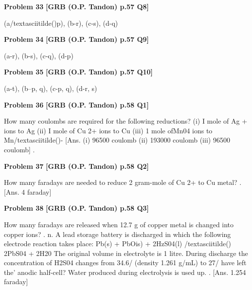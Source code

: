 \begin{problembox}
\textbf{Problem 33} \hfill \textbf{[GRB (O.P. Tandon) p.57 Q8]}
\label{q:ext-grb_all_questions-33}

(a/textasciitilde()p), (b-r), (c-s), (d-q)
\end{problembox}

\begin{problembox}
\textbf{Problem 34} \hfill \textbf{[GRB (O.P. Tandon) p.57 Q9]}
\label{q:ext-grb_all_questions-34}

(a-r), (b-s), (c-q), (d-p)
\end{problembox}

\begin{problembox}
\textbf{Problem 35} \hfill \textbf{[GRB (O.P. Tandon) p.57 Q10]}
\label{q:ext-grb_all_questions-35}

(a-t), (b--p, q), (c-p, q), (d-r, s)
\end{problembox}

\begin{problembox}
\textbf{Problem 36} \hfill \textbf{[GRB (O.P. Tandon) p.58 Q1]}
\label{q:ext-grb_all_questions-36}

How many coulombs are required for the following 
reductions? 
(i) I mole of Ag + ions to Ag 
(ii) I mole of Cu 2+ ions to Cu 
(iii) 1 mole ofMn04 ions to Mn/textasciitilde()-
[Ans. 
(i) 96500 coulomb (ii) 193000 coulomb (iii) 96500 
coulomb] 
.
\end{problembox}

\begin{problembox}
\textbf{Problem 37} \hfill \textbf{[GRB (O.P. Tandon) p.58 Q2]}
\label{q:ext-grb_all_questions-37}

How many faradays are needed to reduce 2 gram-mole of 
Cu 2+ to Cu metal? 
. 
[Ans. 
4 faraday]
\end{problembox}

\begin{problembox}
\textbf{Problem 38} \hfill \textbf{[GRB (O.P. Tandon) p.58 Q3]}
\label{q:ext-grb_all_questions-38}

How many faradays are released when 12.7 g of copper metal 
is changed into copper ions? 
. 
n. A lead storage battery is discharged in which the following 
electrode reaction takes place: 
Pb(s) + PbOis) + 2HzS04(l) /textasciitilde() 
2PbS04 + 2H20 
The original volume in electrolyte is 1 litre. During discharge 
the concentration of H2S04 changes from 34.6/%
(density 1.261 g/mL) to 27/%
have left the' anodic half-cell? Water produced during 
electrolysis is used up. 
. 
[Ans. 
1.254 faraday]
\end{problembox}

